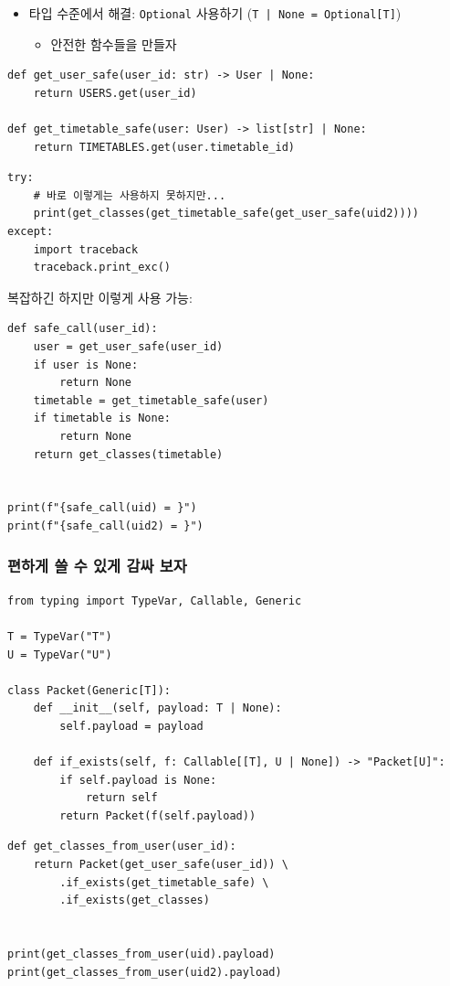 \documentclass[a4paper,11pt]{article}
\begin{document}
\begin{itemize}
\item 타입 수준에서 해결: \texttt{Optional} 사용하기 (\texttt{T | None = Optional[T]})
\begin{itemize}
\item 안전한 함수들을 만들자
\end{itemize}
\end{itemize}
\begin{verbatim}
def get_user_safe(user_id: str) -> User | None:
    return USERS.get(user_id)

def get_timetable_safe(user: User) -> list[str] | None:
    return TIMETABLES.get(user.timetable_id)
\end{verbatim}

\begin{verbatim}
try:
    # 바로 이렇게는 사용하지 못하지만...
    print(get_classes(get_timetable_safe(get_user_safe(uid2))))
except:
    import traceback
    traceback.print_exc()
\end{verbatim}

복잡하긴 하지만 이렇게 사용 가능:
\begin{verbatim}
def safe_call(user_id):
    user = get_user_safe(user_id)
    if user is None:
        return None
    timetable = get_timetable_safe(user)
    if timetable is None:
        return None
    return get_classes(timetable)


print(f"{safe_call(uid) = }")
print(f"{safe_call(uid2) = }")
\end{verbatim}

\subsubsection{편하게 쓸 수 있게 감싸 보자}
\label{sec:org621a595}
\begin{verbatim}
from typing import TypeVar, Callable, Generic

T = TypeVar("T")
U = TypeVar("U")

class Packet(Generic[T]):
    def __init__(self, payload: T | None):
        self.payload = payload

    def if_exists(self, f: Callable[[T], U | None]) -> "Packet[U]":
        if self.payload is None:
            return self
        return Packet(f(self.payload))
\end{verbatim}

\begin{verbatim}
def get_classes_from_user(user_id):
    return Packet(get_user_safe(user_id)) \
        .if_exists(get_timetable_safe) \
        .if_exists(get_classes)


print(get_classes_from_user(uid).payload)
print(get_classes_from_user(uid2).payload)
\end{verbatim}
\end{document}
